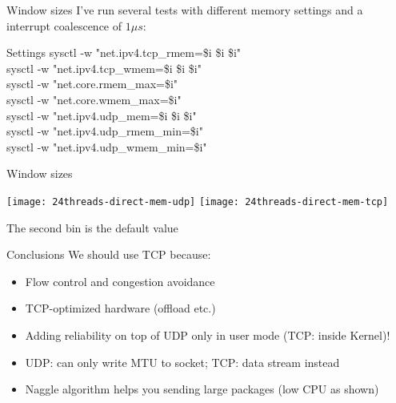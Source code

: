 \begin{frame}{Window sizes}{}
	I've run several tests with different memory settings and a interrupt
	coalescence of $1\mu s$:
	\begin{block}{Settings}
		sysctl -w "net.ipv4.tcp\_rmem=\$i \$i \$i" \\
		sysctl -w "net.ipv4.tcp\_wmem=\$i \$i \$i"\\
		sysctl -w "net.core.rmem\_max=\$i"\\
		sysctl -w "net.core.wmem\_max=\$i"\\
		sysctl -w "net.ipv4.udp\_mem=\$i \$i \$i"\\
		sysctl -w "net.ipv4.udp\_rmem\_min=\$i"\\
		sysctl -w "net.ipv4.udp\_wmem\_min=\$i"
	\end{block}
\end{frame}

\begin{frame}{Window sizes}{}
	\begin{center} 
	\texttt{[image: 24threads-direct-mem-udp]}
	\texttt{[image: 24threads-direct-mem-tcp]}
	\end{center} 
	The second bin is the default value
\end{frame}

\begin{frame}{Conclusions}{}
We should use TCP because:
\begin{itemize}
  \item Flow control and congestion avoidance
  \item TCP-optimized hardware (offload etc.)
  \item Adding reliability on top of UDP only in user mode (TCP: inside Kernel)!
  \item UDP: can only write MTU to socket; TCP: data stream instead
  \item Naggle algorithm helps you sending large packages (low CPU as shown)
\end{itemize}
\end{frame}


